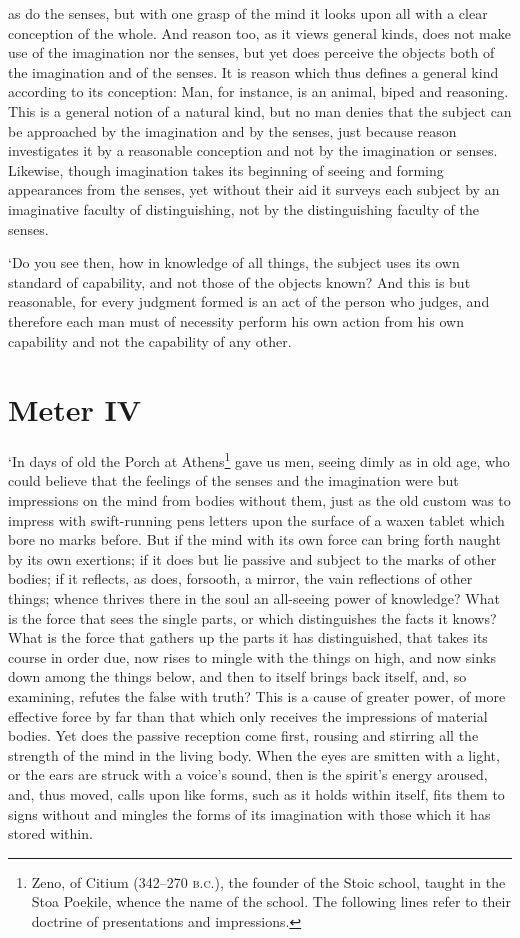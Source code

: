as do the senses, but with one grasp of the mind it looks upon all
with a clear conception of the whole. And reason too, as it views
general kinds, does not make use of the imagination nor the senses,
but yet does perceive the objects both of the imagination and of the
senses. It is reason which thus defines a general kind according to
its conception: Man, for instance, is an animal, biped and reasoning.
This is a general notion of a natural kind, but no man denies that the
subject can be approached by the imagination and by the senses, just
because reason investigates it by a reasonable conception and not by
the imagination or senses. Likewise, though imagination takes its
beginning of seeing and forming appearances from the senses, yet
without their aid it surveys each subject by an imaginative faculty of
distinguishing, not by the distinguishing faculty of the senses.

`Do you see then, how in knowledge of all things, the subject uses its
own standard of capability, and not those of the objects known? And
this is but reasonable, for every judgment formed is an act of the
person who judges, and therefore each man must of necessity perform
 his own action from his own capability and not the
capability of any other.

\section{Meter IV}

`In days of old the Porch at Athens\footnote{Zeno, of Citium (342--270
\textsc{b.c.}), the founder of the Stoic school, taught in the Stoa
Poekile, whence the name of the school. The following lines refer to
their doctrine of presentations and impressions.} gave us men, seeing
dimly as in old age, who could believe that the feelings of the senses
and the imagination were but impressions on the mind from bodies
without them, just as the old custom was to impress with swift-running
pens letters upon the surface of a waxen tablet which bore no marks
before. But if the mind with its own force can bring forth naught by
its own exertions; if it does but lie passive and subject to the marks
of other bodies; if it reflects, as does, forsooth, a mirror, the vain
reflections of other things; whence thrives there in the soul an
all-seeing power of knowledge? What is the force that sees the single
parts, or which distinguishes the facts it knows? What is the force
that gathers up the parts it has distinguished, that takes its course
in order due, now rises to mingle with the things on high, and now
sinks down among the things below, and then to itself brings back
itself, and, so examining, refutes the false with truth? This is a
cause of greater power, of more effective force by far than that which
only receives the impressions of material bodies. Yet does the passive
reception come first, rousing and stirring  all the strength
of the mind in the living body. When the eyes are smitten with a
light, or the ears are struck with a voice's sound, then is the
spirit's energy aroused, and, thus moved, calls upon like forms, such
as it holds within itself, fits them to signs without and mingles the
forms of its imagination with those which it has stored within.


